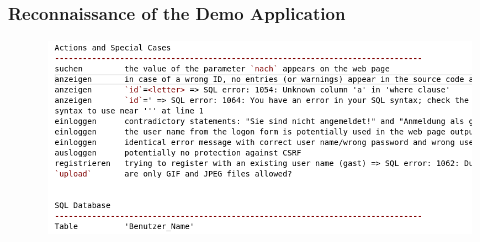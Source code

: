 \documentclass[aspectratio=169]{beamer}
\begin{document}
\begin{frame}
    \frametitle{Reconnaissance of the Demo Application}
    \begin{figure}
        \centering
        \includegraphics[scale=.4]{img/01-recon/recon-action-database.png}        
    \end{figure}
\end{frame}



%    
%    
%    
%    
%

%
%

\end{document}
